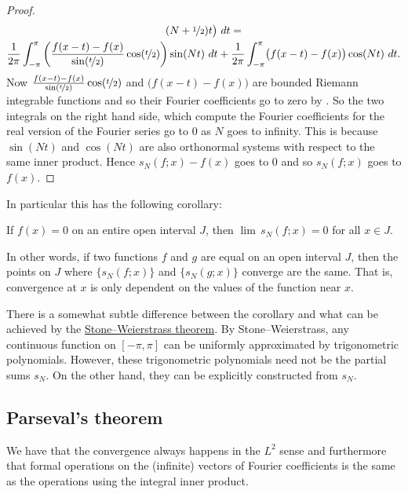 \begin{proof}
\begin{multline*}
(N+\nicefrac{1}{2})t \bigr) ~ dt 
= \\
\frac{1}{2\pi} \int_{-\pi}^\pi
\left( \frac{f(x-t) - f(x)}{\sin(\nicefrac{t}{2})}
\cos (\nicefrac{t}{2}) \right) \sin (Nt) ~ dt
+
\frac{1}{2\pi} \int_{-\pi}^\pi \bigl( f(x-t) - f(x) \bigr)
\cos (Nt) ~ dt .
\end{multline*}
Now 
$\frac{f(x-t) - f(x)}{\sin(\nicefrac{t}{2})} \cos (\nicefrac{t}{2})$
and
$\bigl( f(x-t) - f(x) \bigr)$ are bounded Riemann integrable functions
and so their Fourier coefficients go to zero by .  So the two
integrals on the right hand side, which compute the Fourier coefficients
for the real version of the Fourier series go to 0 as $N$ goes to infinity.
This is because $\sin(Nt)$ and $\cos(Nt)$ are also orthonormal systems
with respect to the same inner product.
Hence $s_N(f;x)-f(x)$ goes to 0 and so $s_N(f;x)$ goes to $f(x)$.
\end{proof}

In particular this has the following corollary:

\begin{cor}
If $f(x) = 0$ on an entire open interval $J$, then $\lim\, s_N(f;x) = 0$
for all $x \in J$.
\end{cor}

In other words, if two functions $f$ and $g$
are equal on an open interval $J$, then the
points on $J$ where $\{ s_N(f;x) \}$ and $\{ s_N(g;x) \}$ converge are the same.  That is,
convergence at $x$ is only dependent on the values of the function
near $x$.

There is a somewhat subtle difference between the corollary and what can be
achieved by the \hyperref[thm:SWcomplex]{Stone--Weierstrass theorem}.
By Stone--Weierstrass, 
any continuous function on $[-\pi,\pi]$ can be uniformly approximated
by trigonometric polynomials.  However, these trigonometric polynomials need
not be the partial sums $s_N$.  On the other hand, they can be
explicitly constructed from $s_N$.

\subsection{Parseval's theorem}

We have that the convergence always happens in the $L^2$ sense and
furthermore that formal operations on the (infinite) vectors of
Fourier coefficients is the same as the operations using the integral
inner product.


